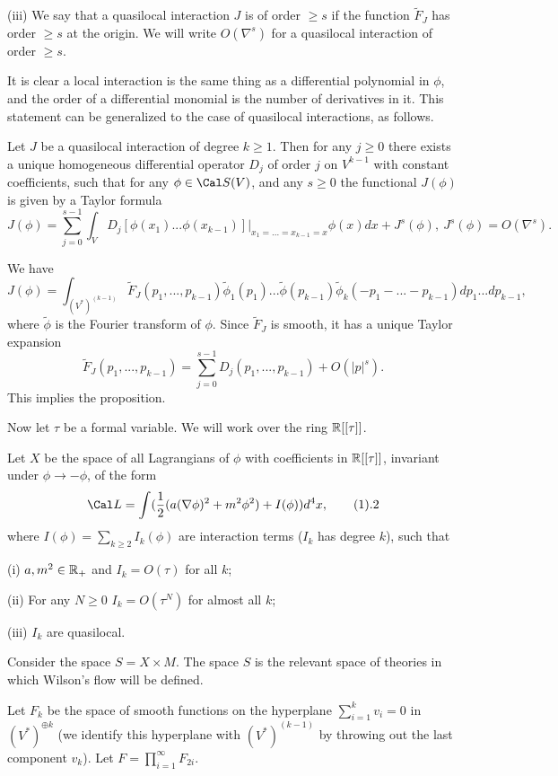 (iii) We say that a quasilocal interaction $J$ is 
of order $\ge s$ if the function $\tilde F_J$ has order 
$\ge s$ at the origin. We will write $O(\nabla^s)$
for a quasilocal interaction of order
$\ge s$.     
\endproclaim

It is clear a local interaction is the same thing as a differential 
polynomial in $\phi$, and the order of a differential 
monomial is the number of derivatives in it. 
This statement can be generalized to
the case of quasilocal interactions, as follows. 

 Let $J$ be a quasilocal interaction
of degree $k\ge 1$. Then for any $j\ge 0$ there exists a unique 
homogeneous differential operator $D_j$ of order $j$ on $V^{k-1}$
with constant coefficients, 
such that for any $\phi\in \Cal S(V)$, and any
$s\ge 0$ the functional $J(\phi)$ is given by
a Taylor formula
$$
J(\phi)=\sum_{j=0}^{s-1}\int_V
D_j[\phi(x_1)...\phi(x_{k-1})]|_{x_1=...=x_{k-1}=x}\phi(x)dx+
J^{s}(\phi),\ J^{s}(\phi)=
O(\nabla^s).
$$
\endproclaim

 We have 
$$
J(\phi)=\int_{(V^*)^(k-1)}\tilde F_J(p_1,...,p_{k-1})
\tilde\phi_1(p_1)...\tilde \phi(p_{k-1})\tilde\phi_k(-p_1-...-p_{k-1})
dp_1...dp_{k-1},
$$
where $\tilde \phi$ is the Fourier transform of $\phi$. 
Since $\tilde F_J$ is smooth, it has a unique  Taylor expansion 
$$
\tilde F_J(p_1,...,p_{k-1})=\sum_{j=0}^{s-1}D_j(p_1,...,p_{k-1})
+O(|p|^s).
$$
This implies the proposition. 
\enddemo

Now let $\tau$ be a formal variable. 
We will work over the ring $\Bbb R[[\tau]]$. 

Let $X$ be the space of all Lagrangians 
of $\phi$ with coefficients in $\Bbb R[[\tau]]$, 
invariant under $\phi\to -\phi$, of the form
$$
\Cal L=
\int (\frac{1}{2}(a(\nabla\phi)^2+m^2\phi^2)+I(\phi))d^4x,\tag 1.2
$$
where 
$I(\phi)=\sum_{k\ge 2} I_k(\phi)$ 
are interaction terms ($I_k$ has degree $k$), such that

(i) $a,m^2\in \Bbb R_+$ and $I_k=O(\tau)$ for all $k$;

(ii) For any $N\ge 0$ $I_k=O(\tau^N)$ for almost all $k$;

(iii) $I_k$ are quasilocal. 

Consider the space $S=X\times M$.  
The space $S$ is the relevant space of theories in which Wilson's 
flow will be defined. 

Let $F_k$ be the space of smooth functions on 
the hyperplane $\sum_{i=1}^k v_i=0$ in $(V^*)^{\oplus k}$
(we identify this hyperplane with $(V^*)^{(k-1)}$
by throwing out the last component $v_k$).
Let $F=\prod_{i=1}^\infty F_{2i}$. 

